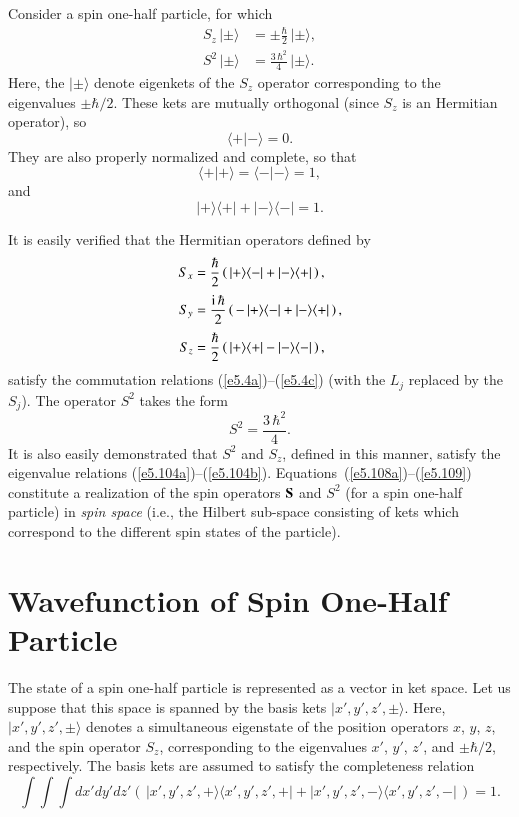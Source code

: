 Consider a spin one-half particle, for which
\begin{align}\label{e5.104a}
S_z \,|\pm \rangle &=\pm \frac{\hbar}{2} \,|\pm \rangle,\\[0.5ex]
S^2\, |\pm\rangle &= \frac{3 \,\hbar^2}{4}\,|\pm \rangle.\label{e5.104b}
\end{align}
Here, the $|\pm \rangle$ denote eigenkets of the $S_z$ operator corresponding to
the eigenvalues $\pm \hbar/2$. These kets are mutually orthogonal (since $S_z$ is
an Hermitian operator), so
\begin{equation}
\langle +| -\rangle = 0.
\end{equation}
They  are also properly normalized and complete, so that
\begin{equation}
\langle +| + \rangle=\langle -| - \rangle = 1,
\end{equation}
and
\begin{equation}
|+\rangle \langle +| + |-\rangle \langle -| = 1.
\end{equation}

It is easily verified that the Hermitian operators defined by
\begin{align}\label{e5.108a}
S_x &= \frac{\hbar}{2} \left(\, |+\rangle \langle -| + |-\rangle \langle +|\,
\right),
\\[0.5ex]
S_y &= \frac{{\rm i}\,\hbar}{2}\left(\, -\,|+\rangle \langle -| +
 |-\rangle \langle +|\,\right),
\\[0.5ex]
S_z &= \frac{\hbar}{2}\left(\, |+\rangle \langle +| - |-\rangle \langle -|\,\right),\label{e5.108c}
\end{align}
satisfy the commutation relations (\ref{e5.4a})--(\ref{e5.4c}) (with the $L_j$ replaced by the $S_j$).
The operator $S^2$ takes the form 
\begin{equation}\label{e5.109}
S^2 = \frac{3\,\hbar^2}{4}.
\end{equation}
It is also easily demonstrated that $S^2$ and $S_z$,
defined in this manner,  satisfy the eigenvalue
relations (\ref{e5.104a})--(\ref{e5.104b}). Equations~(\ref{e5.108a})--(\ref{e5.109}) constitute a realization
of the spin operators ${\bf S}$ and $S^2$ (for a spin one-half particle)
in {\em spin space}\/ ({\rm i.e.}, the Hilbert sub-space consisting of kets which 
correspond to the different spin states of the particle). 

\section{Wavefunction of  Spin One-Half Particle}\label{s5.8}
The state of a spin one-half particle is represented as a vector in ket space.
Let us suppose that this space is spanned by the basis kets
$|x', y', z', \pm\rangle$. Here, $|x',y',z', \pm\rangle$ denotes a
simultaneous eigenstate of the position operators $x$, $y$, $z$, and
the spin operator $S_z$, corresponding to the eigenvalues $x'$, $y'$, $z'$,
and $\pm \hbar/2$, respectively. The basis kets are assumed to
satisfy the completeness relation
\begin{equation}
\int\!\int\!\int  dx'dy'dz' \left(\,
|x',y',z',+\rangle\langle x', y', z',+|+|x',y',z',-\rangle\langle x', y', z',-|
\,\right)= 1.
\end{equation}

